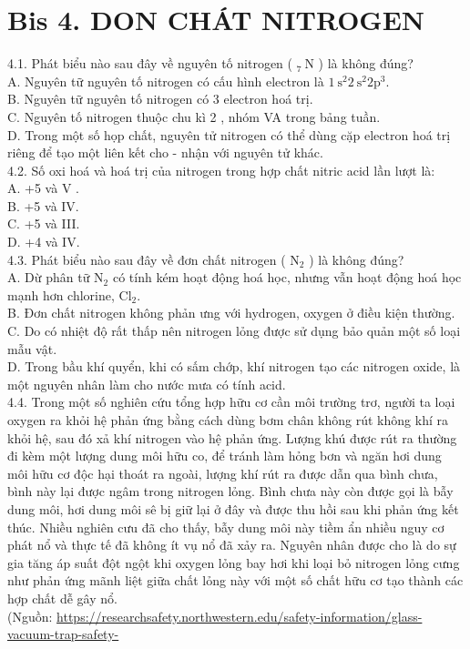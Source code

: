\documentclass[10pt]{article}
\begin{document}
\section*{Bis 4. DON CHÁT NITROGEN}
4.1. Phát biểu nào sau đây về nguyên tố nitrogen ( ${ }_{7} \mathrm{~N}$ ) là không đúng?\\
A. Nguyên tữ nguyên tố nitrogen có cấu hình electron là $1 \mathrm{~s}^{2} 2 \mathrm{~s}^{2} 2 \mathrm{p}^{3}$.\\
B. Nguyên tữ nguyên tố nitrogen có 3 electron hoá trị.\\
C. Nguyên tố nitrogen thuộc chu kì 2 , nhóm VA trong bảng tuần.\\
D. Trong một số họp chất, nguyên tử nitrogen có thể dùng cặp electron hoá trị riêng để tạo một liên kết cho - nhận với nguyên tử khác.\\
4.2. Số oxi hoá và hoá trị của nitrogen trong hợp chất nitric acid lần lượt là:\\
A. +5 và V .\\
B. +5 và IV.\\
C. +5 và III.\\
D. +4 và IV.\\
4.3. Phát biểu nào sau đây về đơn chất nitrogen ( $\mathrm{N}_{2}$ ) là không đúng?\\
A. Dừ phân tữ $\mathrm{N}_{2}$ có tính kém hoạt động hoá học, nhưng vẫn hoạt động hoá học mạnh hơn chlorine, $\mathrm{Cl}_{2}$.\\
B. Đơn chất nitrogen không phản ưng với hydrogen, oxygen ở điều kiện thường.\\
C. Do có nhiệt độ rất thấp nên nitrogen lỏng được sử dụng bảo quản một số loại mẫu vật.\\
D. Trong bầu khí quyển, khi có sấm chớp, khí nitrogen tạo các nitrogen oxide, là một nguyên nhân làm cho nước mưa có tính acid.\\
4.4. Trong một số nghiên cứu tổng hợp hữu cơ cần môi trường trơ, người ta loại oxygen ra khỏi hệ phản ứng bằng cách dùng bơm chân không rút không khí ra khỏi hệ, sau đó xả khí nitrogen vào hệ phản ứng. Lượng khú được rút ra thường đi kèm một lượng dung môi hữu co, để tránh làm hỏng bơn và ngăn hơi dung môi hữu cơ độc hại thoát ra ngoài, lượng khí rút ra được dẫn qua bình chưa, bình này lại được ngâm trong nitrogen lỏng. Bình chưa này còn được gọi là bẫy dung môi, hơi dung môi sê bị giữ lại ở đây và được thu hồi sau khi phản ứng kết thúc. Nhiều nghiên cưu đã cho thấy, bẫy dung môi này tiềm ẩn nhiều nguy cơ phát nổ và thực tế đã không ít vụ nổ đã xảy ra. Nguyên nhân được cho là do sự gia tăng áp suất đột ngột khi oxygen lỏng bay hơi khi loại bỏ nitrogen lỏng cưng như phản ứng mãnh liệt giữa chất lỏng này với một số chất hữu cơ tạo thành các hợp chất dễ gây nổ.\\
(Nguồn: \href{https://researchsafety.northwestern.edu/safety-information/glass-vacuum-trap-safety-}{https://researchsafety.northwestern.edu/safety-information/glass-vacuum-trap-safety-}
\end{document}
